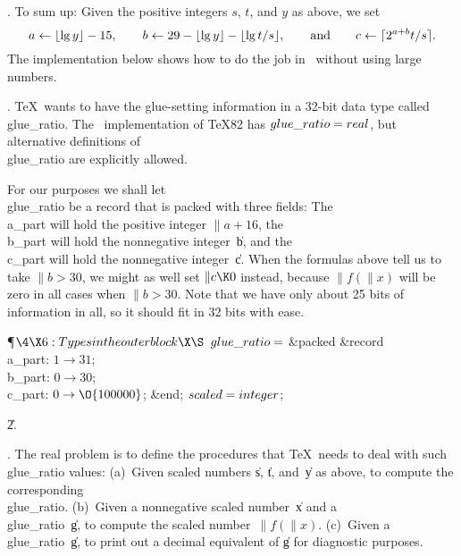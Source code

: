 \fi

. To sum up: Given the positive integers $s$, $t$, and $y$ as above, we
set $$a\gets\lfloor\lg y\rfloor-15,\qquad b\gets29-\lfloor\lg y\rfloor-
\lfloor\lg t/s\rfloor,\qquad\hbox{and}\qquad c\gets\lceil2^{a+b}t/s\rceil.$$
The implementation below shows how to do the job in \PASCAL\ without using
large numbers.

\fi

. \TeX\ wants to have the glue-setting information in a 32-bit data type
called \\{glue\_ratio}. The \PASCAL\ implementation of \TeX82 has $\\{glue%
\_ratio}=\\{real}$, but alternative definitions of \\{glue\_ratio} are
explicitly allowed.

For our purposes we shall let \\{glue\_ratio} be a record that is packed with
three fields: The \\{a\_part} will hold the positive integer $\|a+16$, the
\\{b\_part} will hold the nonnegative integer~\|b, and the \\{c\_part} will
hold
the nonnegative integer~\|c. When the formulas above tell us to take
$\|b>30$, we might as well set $\|c\K0$ instead, because $\|f(\|x)$ will be
zero in all cases when $\|b>30$. Note that we have only about 25 bits of
information in all, so it should fit in 32 bits with ease.

\Y\P$\4\X6:Types in the outer block\X\S$\6
$\\{glue\_ratio}=$\1\5
\&{packed} \1\&{record} \\{a\_part}: $1\to31$;\6
\4\\{b\_part}: $0\to30$;\6
\4\\{c\_part}: $0\to\O{100000}$;\2\6
\&{end};\2\6
$\\{scaled}=\\{integer}$;%
\par
\U2.\fi

. The real problem is to define the procedures that \TeX\ needs to
deal with such \\{glue\_ratio} values:
(a)~Given scaled numbers \|s, \|t, and~\|y as above, to compute the
corresponding \\{glue\_ratio}.
(b)~Given a nonnegative scaled number~\|x and a \\{glue\_ratio}~\|g, to
compute the scaled number~$\|f(\|x)$.
(c)~Given a \\{glue\_ratio}~\|g, to print out a decimal equivalent of
\|g for diagnostic purposes.

